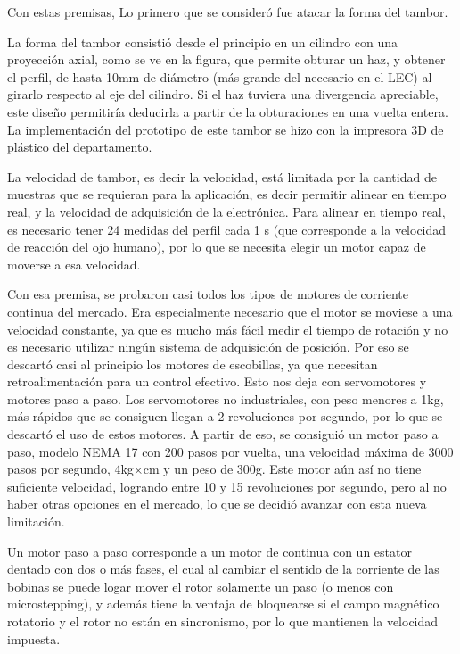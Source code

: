 \documentclass{article}
\begin{document}
Con estas premisas, Lo primero que se consideró fue atacar la forma del tambor. 

La forma del tambor consistió desde el principio en un cilindro con una proyección axial, como se ve en la figura, que permite obturar un haz, y obtener el perfil, de hasta 10mm de diámetro (más grande del necesario en el LEC) al girarlo respecto al eje del cilindro. Si el haz tuviera una divergencia apreciable, este diseño permitiría deducirla a partir de la obturaciones en una vuelta entera. La implementación del prototipo de este tambor se hizo con la impresora 3D de plástico del departamento.

La velocidad de tambor, es decir la velocidad, está limitada por la cantidad de muestras que se requieran para la aplicación, es decir permitir alinear en tiempo real, y la velocidad de adquisición de la electrónica. Para alinear en tiempo real, es necesario tener 24 medidas del perfil cada 1 s (que corresponde a la velocidad de reacción del ojo humano), por lo que se necesita elegir un motor capaz de moverse a esa velocidad. 

Con esa premisa, se probaron casi todos los tipos de motores de corriente continua del mercado. Era especialmente necesario que el motor se moviese a una velocidad constante, ya que es mucho más fácil medir el tiempo de rotación y no es necesario utilizar ningún sistema de adquisición de posición. Por eso se descartó casi al principio los motores de escobillas, ya que necesitan retroalimentación para un control efectivo. Esto nos deja con servomotores y motores paso a paso. Los servomotores no industriales, con peso menores a 1kg, más rápidos que se consiguen llegan a 2 revoluciones por segundo, por lo que se descartó el uso de estos motores. A partir de eso, se consiguió un motor paso a paso, modelo NEMA 17 con 200 pasos por vuelta, una velocidad máxima de 3000 pasos por segundo, 4kg$\times$cm y un peso de 300g.  Este motor aún así no tiene suficiente velocidad, logrando entre 10 y 15 revoluciones por segundo, pero al no haber otras opciones en el mercado, lo que se decidió avanzar con esta nueva limitación.

Un motor paso a paso corresponde a un motor de continua con un estator dentado con dos o más fases, el cual al cambiar el sentido de la corriente de las bobinas se puede logar mover el rotor solamente un paso (o menos con microstepping), y además tiene la ventaja de bloquearse si el campo magnético rotatorio y el rotor no están en sincronismo, por lo que mantienen la velocidad impuesta.
\end{document}
